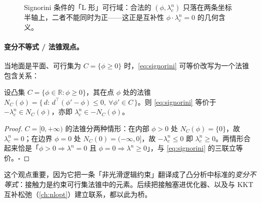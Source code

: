 \begin{figure}[ht]
\centering
{}
\caption{Signorini 条件的「L 形」可行域：合法的 $(\phi,\lambda_c^n)$ 只落在两条坐标半轴上，二者不能同时为正——这正是互补性 $\phi\cdot\lambda_c^n=0$ 的几何含义。}
\label{fig:contact-Lshape}
\end{figure}

\paragraph{变分不等式 / 法锥观点。}
当地面是平面、可行集为 $C=\{\phi\ge0\}$ 时，\cref{eq:signorini} 可等价改写为一个法锥包含关系：

\begin{proposition}
\label{prop:signorini-normalcone}
设凸集 $C=\{\phi\in\mathbb{R}:\phi\ge0\}$，其在点 $\phi$ 处的法锥
$N_C(\phi)=\{\,d:\,d^\top(\phi'-\phi)\le0,\ \forall\phi'\in C\,\}$。则 \cref{eq:signorini} 等价于 $-\lambda_c^n\in N_C(\phi)$，亦即 $\lambda_c^n\in -N_C(\phi)$。
\end{proposition}
\begin{proof}
$C=[0,+\infty)$ 的法锥分两种情形：在内部 $\phi>0$ 处 $N_C(\phi)=\{0\}$，故 $\lambda_c^n=0$；在边界 $\phi=0$ 处 $N_C(0)=(-\infty,0]$，故 $-\lambda_c^n\le0$ 即 $\lambda_c^n\ge0$。两情形合起来恰是「$\phi>0\Rightarrow\lambda^n=0$ 且 $\phi=0\Rightarrow\lambda^n\ge0$」，与 \cref{eq:signorini} 的三联立等价。$\square$
\end{proof}

\noindent 这个观点重要，因为它把一条「非光滑逻辑约束」翻译成了凸分析中标准的\emph{变分不等式}：接触力是约束可行集法锥中的元素。后续把接触塞进优化器、以及与 KKT 互补松弛（\cref{ch:nlopt}）建立联系，都以此为桥。

